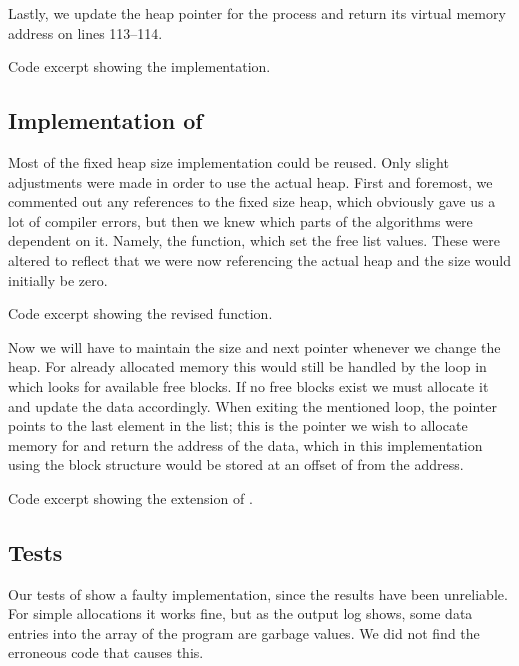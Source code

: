 Lastly, we update the heap pointer for the process and return its virtual
memory address on lines 113--114.

{Code excerpt showing the  implementation.}

\subsection{Implementation of }
Most of the fixed heap size implementation could be reused. Only slight
adjustments were made in order to use the actual heap. First and foremost, we
commented out any references to the fixed size heap, which obviously gave us a
lot of compiler errors, but then we knew which parts of the algorithms were
dependent on it. Namely, the  function, which set the free
list values. These were altered to reflect that we were now referencing the
actual heap and the size would initially be zero.

{Code excerpt showing the revised  function.}

Now we will have to maintain the size and next pointer whenever we change the
heap. For already allocated memory this would still be handled by the loop in
 which looks for available free blocks. If no free blocks exist
we must allocate it and update the data accordingly. When exiting the
mentioned loop, the pointer  points to the last element in the
list; this is the pointer we wish to allocate memory for and return the
address of the data, which in this implementation using the block structure
would be stored at an offset of  from the  address.

{Code excerpt showing the extension of .}

\subsection{Tests}
Our tests of  show a faulty implementation, since the results
have been unreliable. For simple allocations it works fine, but as the output
log  shows, some data entries into the 
array of the  program are garbage values. We did not
find the erroneous code that causes this.

